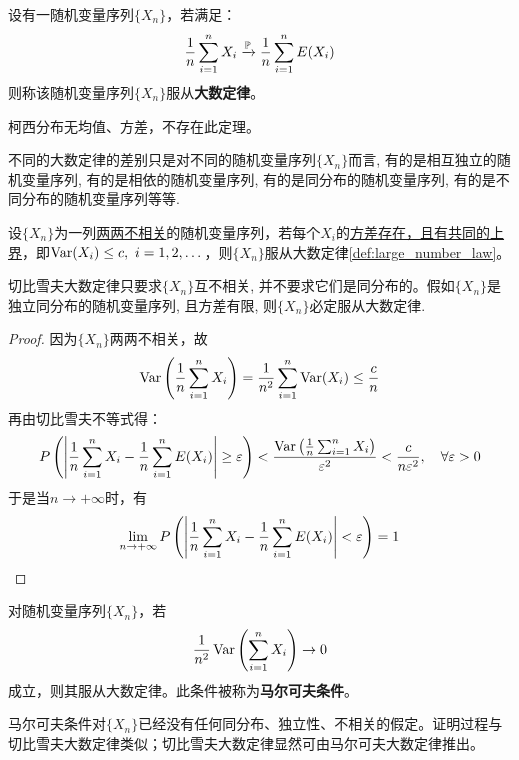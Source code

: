 \begin{definition}[大数定律的一般形式]\label{def:large_number_law}
    设有一随机变量序列$\{ X_n \}$，若满足：
    \[ \frac1n \sum_{i=1}^n X_i \xrightarrow{\P} \frac1n \sum_{i=1}^n E(X_i) \]
    则称该随机变量序列$\{ X_n \}$服从\textbf{大数定律}。
\end{definition}
\begin{note}
    柯西分布无均值、方差，不存在此定理。
\end{note}

不同的大数定律的差别只是对不同的随机变量序列$\{ X_n \}$而言, 有的是相互独立的随机变量序列, 有的是相依的随机变量序列, 有的是同分布的随机变量序列, 有的是不同分布的随机变量序列等等.

\begin{theorem}[切比雪夫大数定律]
    设$\{ X_n \}$为一列\underline{两两不相关}的随机变量序列，若每个$X_i$的\underline{方差存在，且有共同的上界}，即$\Var(X_i) \le c ,\ i=1,2, \dotsc$，则$\{ X_n \}$服从大数定律\ref{def:large_number_law}。
\end{theorem}
\begin{remark}
    切比雪夫大数定律只要求$\{ X_n \}$互不相关, 并不要求它们是同分布的。假如$\{ X_n \}$是独立同分布的随机变量序列, 且方差有限, 则$\{ X_n \}$必定服从大数定律.
\end{remark}
\begin{proof}
    因为$\{ X_n \}$两两不相关，故
    \[ \Var \left(\frac1n \sum_{i=1}^n X_i \right) = \frac1{n^2} \sum_{i=1}^n\Var(X_i) \leq \frac{c}{n} \]
    再由切比雪夫不等式得：
    \[ P \left(\left\lvert \frac1n \sum_{i=1}^n X_i - \frac1n \sum_{i=1}^n E(X_i) \right\rvert \ge  \e \right) < \frac{\Var\left(\frac1n \sum_{i=1}^n X_i \right)}{\e^2} < \frac{c}{n\e^2} ,\quad \forall \e > 0 \]
    于是当$n \to +\infty$时，有
    \[ \lim_{n \to +\infty} P \left(\left\lvert \frac1n \sum_{i=1}^n X_i - \frac1n \sum_{i=1}^n E(X_i) \right\rvert < \e \right) = 1 \]
\end{proof}

\begin{theorem}[马尔可夫大数定律]
    对随机变量序列$\{ X_n \}$，若
    \[ \frac1{n^2}\Var \left(\sum_{i=1}^n X_i \right) \to 0 \]
    成立，则其服从大数定律。此条件被称为\textbf{马尔可夫条件}。
\end{theorem}
\begin{remark}
    马尔可夫条件对$\{ X_n \}$已经没有任何同分布、独立性、不相关的假定。证明过程与切比雪夫大数定律类似；切比雪夫大数定律显然可由马尔可夫大数定律推出。
\end{remark}


